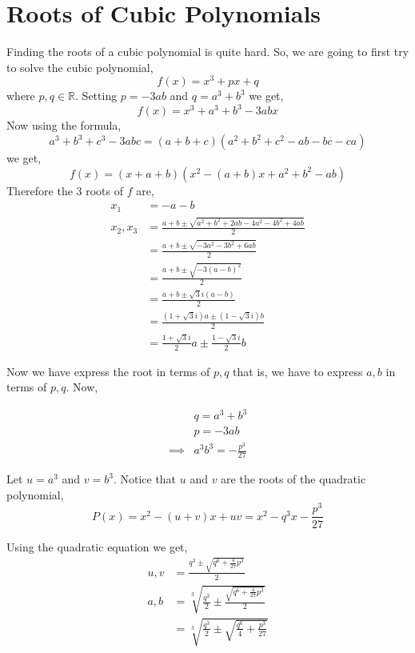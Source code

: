 \documentclass[11pt,numbers=noenddot,svgnames]{scrbook}
\begin{document}
\section{Roots of Cubic Polynomials}

Finding the roots of a cubic polynomial is quite hard. So, we are going to first try to solve the cubic polynomial,
\[
    f(x) = x^{3} + px + q
\]
where $p, q \in \mathbb{R}$.
Setting $p=-3ab$ and $q = a^{3} + b^{3}$ we get,
\[
    f(x) = x^{3} + a^{3} + b^{3} - 3abx
\]
Now using the formula,
\[
    a^{3} + b^{3} + c^{3} - 3abc = (a+b+c)(a^{2} + b^{2} + c^{2} - ab - bc - ca)
\]
we get,
\[
    f(x) = (x+a+b)(x^{2} -(a+b)x + a^{2} + b^{2} - ab)
\]
Therefore the 3 roots of $f$ are,
\begin{align*}
    x_{1}        &= -a-b \\
    x_{2}, x_{3} &= \frac{a+b \pm \sqrt{a^{2} + b^{2} + 2ab - 4a^{2} - 4b^{2} + 4ab}}{2}\\
                 &= \frac{a+b \pm \sqrt{-3a^{2} -3b^{2} + 6ab}}{2} \\
                 &= \frac{a+b \pm \sqrt{-3(a-b)^{2}}}{2} \\
                 &= \frac{a+b \pm \sqrt{3}i(a-b)}{2} \\
                 &= \frac{(1 + \sqrt{3}i)a \pm (1 - \sqrt{3}i)b}{2} \\
                 &= \frac{1+\sqrt{3}i}{2}a \pm \frac{1-\sqrt{3}i}{2}b
\end{align*}

Now we have express the root in terms of $p, q$ that is, we have to express $a,b$ in terms of $p,q$. Now,

\begin{align*}
         & q = a^{3} + b^{3} \\
         & p = -3ab \\
\implies & a^{3}b^{3} = -\frac{p^{3}}{27}
\end{align*}

Let $u=a^{3}$ and $v=b^{3}$. Notice that $u$ and $v$ are the roots of the quadratic polynomial,
\[
    P(x) = x^{2} - (u+v)x + uv = x^{2} - q^{3}x -\frac{p^{3}}{27} 
\]

Using the quadratic equation we get,
\begin{align*}
    u,v &= \frac{q^{3} \pm \sqrt{q^{6} + \frac{4}{27}p^{3}}}{2} \\
    a,b &= \sqrt[3]{\frac{q^{3}}{2} \pm \frac{\sqrt{q^{6} + \frac{4}{27}p^{3}}}{2}}\\
        &= \sqrt[3]{\frac{q^{3}}{2} \pm \sqrt{\frac{q^{6}}{4} + \frac{p^{3}}{27}}}
\end{align*}
\end{document}
